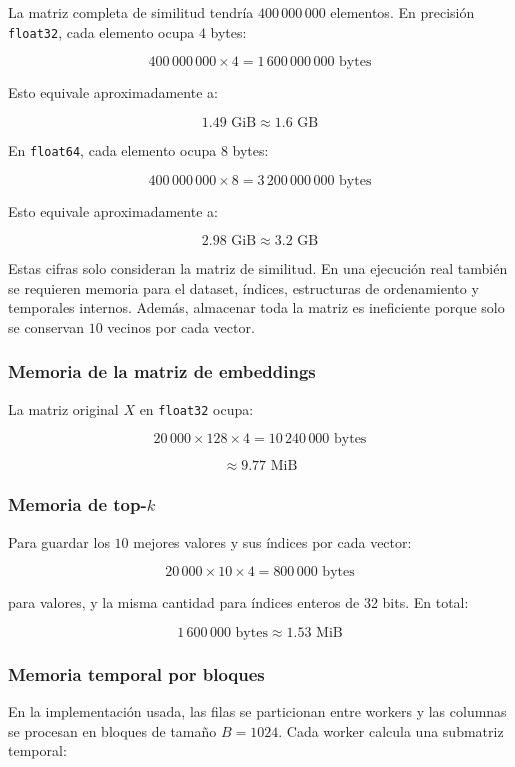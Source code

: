 \documentclass[10pt,a4paper]{article}
\begin{document}
La matriz completa de similitud tendr\'ia $400\,000\,000$ elementos. En
precisi\'on \texttt{float32}, cada elemento ocupa $4$ bytes:

\[
400\,000\,000 \times 4 = 1\,600\,000\,000 \text{ bytes}
\]

Esto equivale aproximadamente a:

\[
1.49 \text{ GiB} \approx 1.6 \text{ GB}
\]

En \texttt{float64}, cada elemento ocupa $8$ bytes:

\[
400\,000\,000 \times 8 = 3\,200\,000\,000 \text{ bytes}
\]

Esto equivale aproximadamente a:

\[
2.98 \text{ GiB} \approx 3.2 \text{ GB}
\]

Estas cifras solo consideran la matriz de similitud. En una ejecuci\'on real
tambi\'en se requieren memoria para el dataset, \'indices, estructuras de
ordenamiento y temporales internos. Adem\'as, almacenar toda la matriz es
ineficiente porque solo se conservan $10$ vecinos por cada vector.

\subsubsection{Memoria de la matriz de embeddings}

La matriz original $X$ en \texttt{float32} ocupa:

\[
20\,000 \times 128 \times 4 = 10\,240\,000 \text{ bytes}
\]

\[
\approx 9.77 \text{ MiB}
\]

\subsubsection{Memoria de top-$k$}

Para guardar los $10$ mejores valores y sus \'indices por cada vector:

\[
20\,000 \times 10 \times 4 = 800\,000 \text{ bytes}
\]

para valores, y la misma cantidad para \'indices enteros de 32 bits. En total:

\[
1\,600\,000 \text{ bytes} \approx 1.53 \text{ MiB}
\]

\subsubsection{Memoria temporal por bloques}

En la implementaci\'on usada, las filas se particionan entre workers y las
columnas se procesan en bloques de tama\~no $B=1024$. Cada worker calcula una
submatriz temporal:
\end{document}
